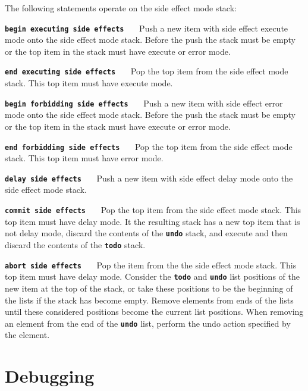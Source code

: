 \documentclass[12pt]{article}
\newcommand{\TT}[1]{{\tt \bfseries #1}}
\newcommand{\ttkey}[1]{{\tt \bfseries #1}}
\begin{document}
The following statements operate on the side effect mode stack:

\begin{list}{}{}
\item[\ttkey{begin executing side effects}]~~~Push a new item with side effect
execute mode onto the side effect mode stack.  Before the push the
stack must be empty or the top item in the stack must have execute or
error mode.

\item[\ttkey{end executing side effects}]~~~Pop the top item from
the side effect mode stack.  This top item must have
execute mode.

\item[\ttkey{begin forbidding side effects}]~~~Push
a new item with side effect
error mode onto the side effect mode stack.  Before the push the
stack must be empty or the top item in the stack must have execute or
error mode.

\item[\ttkey{end forbidding side effects}]~~~Pop the top item from the
side effect mode stack.  This top item must have
error mode.

\item[\ttkey{delay side effects}]~~~Push a new item with side effect
delay mode onto the side effect mode stack.

\item[\ttkey{commit side effects}]~~~Pop the top item from the
side effect mode stack.  This top item must have
delay mode.  It the resulting stack has a new top item that is not
delay mode, discard the contents of the \TT{undo} stack, and execute
and then discard the contents of the \TT{todo} stack.

\item[\ttkey{abort side effects}]~~~Pop the item from the
the side effect mode stack.  This top item must have
delay mode.  Consider the \TT{todo} and \TT{undo} list positions
of the new item at the top of the stack, or take these positions to be
the beginning of the lists if the stack has become empty.  Remove
elements from ends of the lists until these considered positions become
the current list positions.  When removing an element from the end of the
\TT{undo} list, perform the undo action specified by the element.

\end{list}

\section{Debugging}
\end{document}
